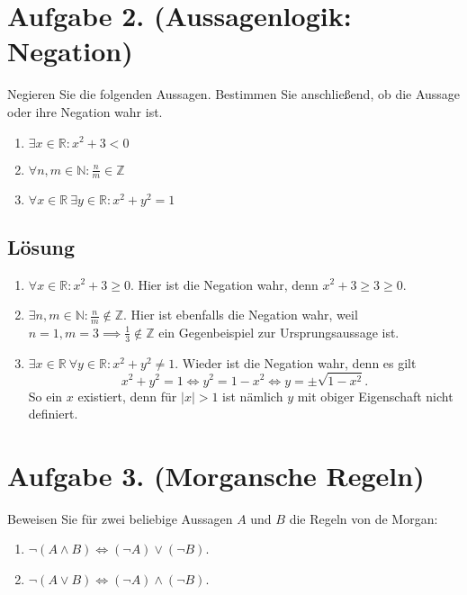 \documentclass[german,12pt]{homework}
\begin{document}
    \section*{Aufgabe 2. (Aussagenlogik: Negation)}

    \begin{problem}
        Negieren Sie die folgenden Aussagen. Bestimmen Sie anschließend, ob die Aussage oder ihre Negation wahr ist.
        \begin{enumerate}
            \item \({\exists}x \in \mathbb{R}: x^2 + 3 < 0\)
            \item \({\forall}n, m \in \mathbb{N}: \frac{n}{m} \in \mathbb{Z}\)
            \item \({\forall}x \in \mathbb{R}\ {\exists}y \in \mathbb{R}: x^2 + y^2 = 1\)
        \end{enumerate}
    \end{problem}

    \subsection*{Lösung}
    \begin{enumerate}
        \item \({\forall}x \in \mathbb{R}: x^2 + 3 \ge 0\). Hier ist die Negation wahr, denn \(x^2 + 3 \ge 3 \ge 0\).
        \item \({\exists}n, m \in \mathbb{N}: \frac{n}{m} \not\in \mathbb{Z}\). Hier ist ebenfalls die Negation wahr, weil \(n = 1, m = 3 \implies \frac{1}{3} \not\in \mathbb{Z}\) ein Gegenbeispiel zur Ursprungsaussage ist.
        \item \({\exists}x \in \mathbb{R}\ {\forall}y \in \mathbb{R}: x^2 + y^2 \ne 1\). Wieder ist die Negation wahr, denn es gilt
        \[x^2 + y^2 = 1 \iff y^2 = 1 - x^2 \iff y = \pm\sqrt{1 - x^2}.\]
        So ein \(x\) existiert, denn für \(\left|x\right| > 1\) ist nämlich \(y\) mit obiger Eigenschaft nicht definiert.
    \end{enumerate}

    \section*{Aufgabe 3. (Morgansche Regeln)}

    \begin{problem}
        Beweisen Sie für zwei beliebige Aussagen \(A\) und \(B\) die Regeln von de Morgan:
        \begin{enumerate}
            \item \({\lnot}\left(A \land B\right) \iff \left({\lnot}A\right) \lor \left({\lnot}B\right)\).
            \item \({\lnot}\left(A \lor B\right) \iff \left({\lnot}A\right) \land \left({\lnot}B\right)\).
        \end{enumerate}
    \end{problem}
\end{document}
